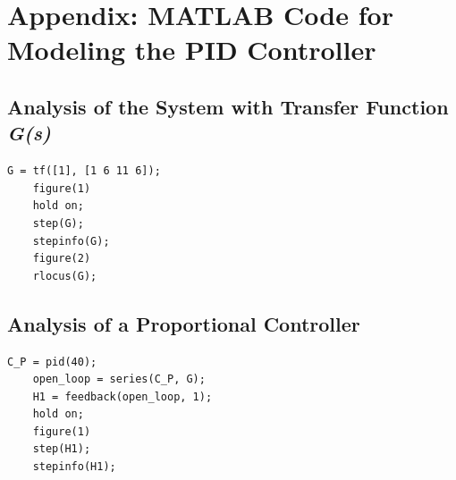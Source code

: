 \documentclass[a4paper, twocolumn, titlepage, 10pt]{article}
\begin{document}
	\section{Appendix: MATLAB Code for Modeling the PID Controller}
		\subsection{Analysis of the System with Transfer Function \textit{G(s)}}
			\begin{lstlisting}[frame=single]
	G = tf([1], [1 6 11 6]);
	figure(1)
	hold on;
	step(G);
	stepinfo(G);
	figure(2)
	rlocus(G);
			\end{lstlisting}
		\subsection{Analysis of a Proportional Controller}
			\begin{lstlisting}[frame=single]
	C_P = pid(40);
	open_loop = series(C_P, G);
	H1 = feedback(open_loop, 1);
	hold on;
	figure(1)
	step(H1);
	stepinfo(H1);
			\end{lstlisting}
\end{document}
